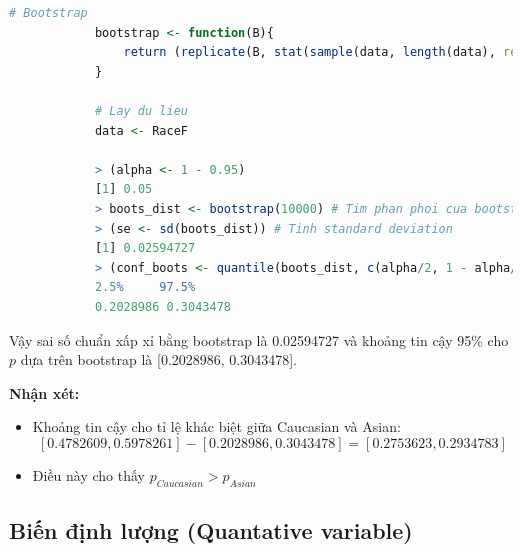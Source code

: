\documentclass[a4paper,12pt]{article}
\begin{document}
\begin{enumerate}[label = \alph*)]
\begin{lstlisting}[language=R]
			# Bootstrap
			bootstrap <- function(B){
				return (replicate(B, stat(sample(data, length(data), replace = TRUE))))
			}
			
			# Lay du lieu
			data <- RaceF
			
			> (alpha <- 1 - 0.95)
			[1] 0.05
			> boots_dist <- bootstrap(10000) # Tim phan phoi cua bootstrap
			> (se <- sd(boots_dist)) # Tinh standard deviation
			[1] 0.02594727
			> (conf_boots <- quantile(boots_dist, c(alpha/2, 1 - alpha/2))) # Tim khoang tin cay cho p
			2.5%     97.5% 
			0.2028986 0.3043478
			\end{lstlisting}
			Vậy sai số chuẩn xấp xỉ bằng bootstrap là 0.02594727 và khoảng tin cậy 95\% cho $p$ dựa trên bootstrap
			là [0.2028986, 0.3043478].
	\end{enumerate}
	
	\textbf{Nhận xét:}
	\begin{itemize}
		\item Khoảng tin cậy cho tỉ lệ khác biệt giữa Caucasian và Asian:
		$$[0.4782609, 0.5978261] - [0.2028986, 0.3043478] = [0.2753623, 0.2934783]$$
		\item Điều này cho thấy $p_{Caucasian} > p_{Asian}$
	\end{itemize}
	
	\subsection{Biến định lượng (Quantative variable)}
\end{document}

